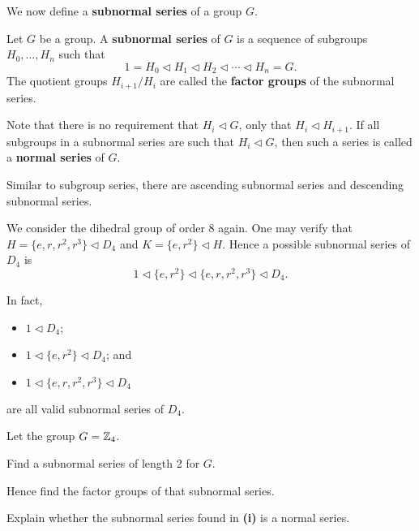We now define a \textbf{subnormal series} of a group $G$.
\begin{definition}
    Let $G$ be a group. A \textbf{subnormal series} of $G$ is a sequence of subgroups $H_0, \dots, H_n$ such that
    \[
        1 = H_0 \lhd H_1 \lhd H_2 \lhd \cdots \lhd H_n = G.    
    \]
    The quotient groups $H_{i+1}/H_i$ are called the \textbf{factor groups} of the subnormal series.
\end{definition}
\begin{remark}
    Note that there is no requirement that $H_i \lhd G$, only that $H_i \lhd H_{i+1}$. If all subgroups in a subnormal series are such that $H_i \lhd G$, then such a series is called a \textbf{normal series} of $G$.
\end{remark}
\begin{remark}
    Similar to subgroup series, there are ascending subnormal series and descending subnormal series.
\end{remark}

\begin{example}
    We consider the dihedral group of order 8 again. One may verify that $H = \{e, r, r^2, r^3\} \lhd D_4$ and $K = \{e, r^2\} \lhd H$. Hence a possible subnormal series of $D_4$ is
    \[
        1 \lhd \{e, r^2\} \lhd \{e, r, r^2, r^3\} \lhd D_4.
    \]

    In fact,
    \begin{itemize}
        \item $1 \lhd D_4$;
        \item $1 \lhd \{e, r^2\} \lhd D_4$; and
        \item $1 \lhd \{e, r, r^2, r^3\} \lhd D_4$
    \end{itemize}
    are all valid subnormal series of $D_4$.
\end{example}

\begin{exercise}
    Let the group $G = \mathbb{Z}_4$.
    \begin{partquestions}{\roman*}
        \item Find a subnormal series of length 2 for $G$.
        \item Hence find the factor groups of that subnormal series.
        \item Explain whether the subnormal series found in \textbf{(i)} is a normal series.
    \end{partquestions}
\end{exercise}

